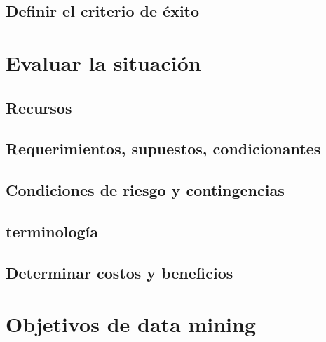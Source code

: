 \documentclass[11pt,a4paper,twoside]{tesis}
\begin{document}
\subsection{Definir el criterio de éxito}

\section{Evaluar la situación}
\subsection{Recursos}

\subsection{Requerimientos, supuestos, condicionantes}

\subsection{Condiciones de riesgo y contingencias}

\subsection{terminología}
\subsection{Determinar costos y beneficios}

\section{Objetivos de data mining}
\end{document}
